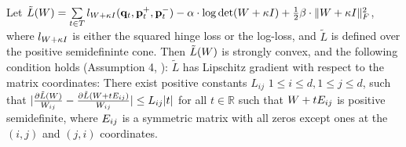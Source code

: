 \documentclass{article}
\begin{document}
\begin{lemma}
Let $\tilde{L}({W})=\sum\limits_{t\in T}{l_{{W} + \kappa I}(\mathbf{q}_t, \mathbf{p}_{t}^{+}, \mathbf{p}_{t}^{-})} - \alpha \cdot \log \det({W} + \kappa I) + \tfrac{1}{2} \beta \cdot \| {W} + \kappa I \|_{F}^{2}$, where $l_{{W} + \kappa I}$ is either the squared hinge loss or the log-loss, and $\tilde{L}$ is defined over the positive semidefininte cone.
Then $\tilde{L}({W})$ is strongly convex, and the following condition holds (Assumption 4, \citet{richtarik2013optimal}): $\tilde{L}$ has Lipschitz gradient with respect to the matrix coordinates: There exist positive constants $L_{ij}$ $1 \leq i \leq d, 1 \leq j \leq d$, such that $| \frac{\partial \tilde{L}({W})}{W_{ij}} - \frac{\partial \tilde{L}({W} + t {E}_{ij})}{W_{ij}} | \leq L_{ij} |t|$ for all $t \in \mathbb{R}$ such that ${W} + t{E}_{ij}$ is positive semidefinite, where ${E}_{ij}$ is a symmetric matrix with all zeros except ones at the $(i,j)$ and $(j,i)$ coordinates.


\end{lemma}
\end{document}
